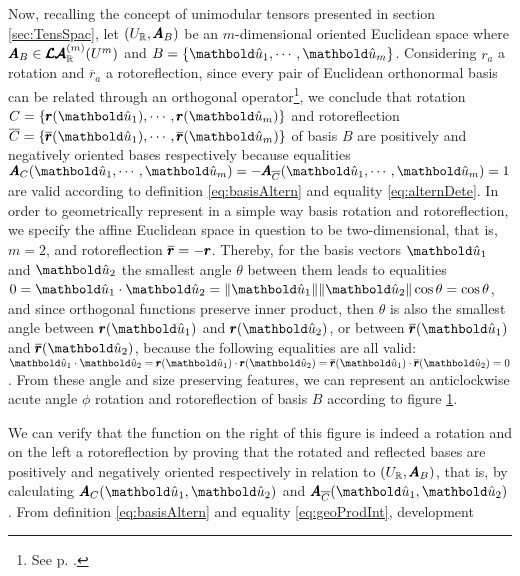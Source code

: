 Now, recalling the concept of unimodular tensors presented in section \ref{sec:TensSpac}, let $(U_{\mathbb{R}},\pmb{A}_B)$ be an $m$-dimensional oriented Euclidean space where $\pmb{A}_B\in\pmb{\mathcal{LA}}^{(m)}_{\mathbb{R}}(U^m)$ and $B=\{\vun{u}_1,\cdots,\vun{u}_m\}$. Considering $\mathit{r}_a$ a rotation and $\overline{\mathit{r}}_a$ a rotoreflection, since every pair of Euclidean orthonormal basis can be related through an orthogonal operator\footnote{See p. \pageref{prg:orthBases}.}, we conclude that rotation  $C=\{\fua{\vtf{r}}{\vun{u}_1},\cdots,\fua{\vtf{r}}{\vun{u}_m}\}$ and rotoreflection $\overline{C}=\{\fua{\overline{\vtf{r}}}{\vun{u}_1},\cdots,\fua{\overline{\vtf{r}}}{\vun{u}_m}\}$ of basis $B$ are positively and negatively oriented bases respectively because equalities $\fua{\tnr{A}_C}{\vun{u}_1,\cdots,\vun{u}_m}=-\fua{\tnr{A}_{\overline{C}}}{\vun{u}_1,\cdots,\vun{u}_m}=1$ are valid according to definition \eqref{eq:basisAltern} and equality \eqref{eq:alternDete}. In order to geometrically represent in a simple way basis rotation and rotoreflection, we specify the affine Euclidean space in question to be two-dimensional, that is, $m=2$, and rotoreflection $\overline{\pmb{r}}=-\pmb{r}$. Thereby, for the basis vectors $\vun{u}_1$ and $\vun{u}_2$ the smallest angle $\theta$ between them leads to equalities $0=\vun{u}_1\cdot\vun{u}_2=\|\vun{u}_1\|\|\vun{u}_2\|\cos\theta=\cos\theta$, and since orthogonal functions preserve inner product, then $\theta$ is also the smallest angle between $\fua{\vtf{r}}{\vun{u}_1}$ and $\fua{\vtf{r}}{\vun{u}_2}$, or between $\fua{\overline{\vtf{r}}}{\vun{u}_1}$ and $\fua{\overline{\vtf{r}}}{\vun{u}_2}$, because the following equalities are all valid: $\vun{u}_1\cdot\vun{u}_2=\fua{\vtf{r}}{\vun{u}_1}\cdot\fua{\vtf{r}}{\vun{u}_2}=\fua{\overline{\vtf{r}}}{\vun{u}_1}\cdot\fua{\overline{\vtf{r}}}{\vun{u}_2}=0$. From these angle and size preserving features, we can represent an anticlockwise acute angle $\phi$ rotation and rotoreflection of basis $B$ according to figure \ref{fg:rotoReflex}.
\begin{figure}[!ht]
\centering
\begin{center}
\scalebox{.72}{}
\end{center}
\label{fg:rotoReflex}
\end{figure}
We can verify that the function on the right of this figure is indeed a rotation and on the left a rotoreflection by proving that the rotated and reflected bases are positively and negatively oriented respectively in relation to $(U_{\mathbb{R}},\pmb{A}_B)$, that is, by calculating $\fua{\tnr{A}_C}{\vun{u}_1,\vun{u}_2}$ and $\fua{\tnr{A}_{\overline{C}}}{\vun{u}_1,\vun{u}_2}$. From definition \eqref{eq:basisAltern} and equality \eqref{eq:geoProdInt}, development
